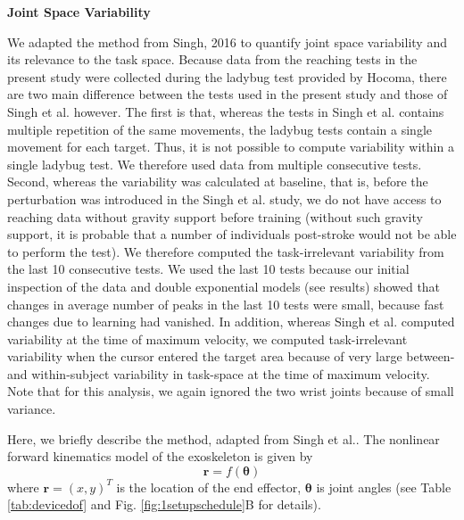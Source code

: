 \textbf{Joint Space Variability}

We adapted the method from {Singh, 2016} to quantify joint space variability and its relevance to the task space. 
Because data from the reaching tests in the present study were collected during the ladybug test provided by Hocoma, there are two main difference between the tests used in the present study and those of Singh et al. however. 
The first is that, whereas the tests in Singh et al. contains multiple repetition of the same movements, the ladybug tests contain a single movement for each target. 
Thus, it is not possible to compute variability within a single ladybug test. 
We therefore used data from multiple consecutive tests. 
Second, whereas the variability was calculated at baseline, that is, before the perturbation was introduced in the Singh et al. study, we do not have access to reaching data without gravity support before training (without such gravity support, it is probable that a number of individuals post-stroke would not be able to perform the test). 
We therefore  computed the task-irrelevant variability from the last 10 consecutive tests. 
We used the last 10 tests because our initial inspection of the data and double exponential models (see results) showed that changes in average number of peaks in the last 10 tests were small, because fast changes due to learning had vanished. 
In addition, whereas Singh et al. computed variability at the time of maximum velocity, we computed task-irrelevant variability when the cursor entered the target area because of very large between- and within-subject variability in task-space at the time of maximum velocity.
Note that for this analysis, we again ignored the two wrist joints because of small variance. 

Here, we briefly describe the method, adapted from Singh et al..
The nonlinear forward kinematics model of the exoskeleton is given by
	\begin{equation}\label{eqn:nonlinearForwardKinematics}
		\bm{r} = f(\bm{\theta})
	\end{equation}
where $ \bm{r} = (x,y)^T $ is the location of the end effector, $ \bm{\theta} $ is joint angles (see Table \ref{tab:devicedof} and Fig. \ref{fig:1setupschedule}B for details). 

